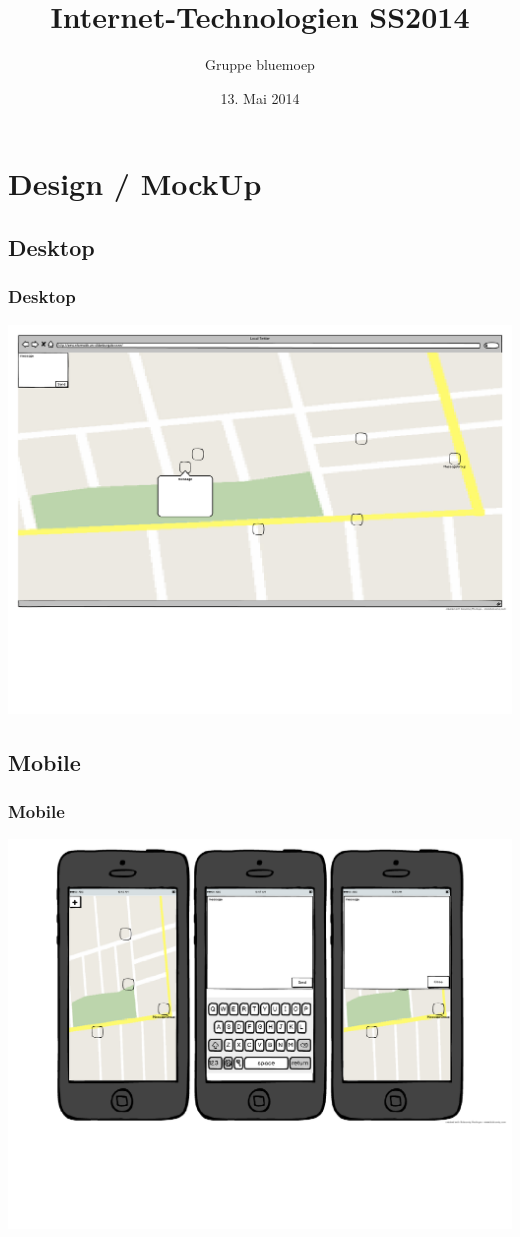 \documentclass[aspectratio=43]{beamer}
\title{Internet-Technologien SS2014}
\author{Gruppe bluemoep}
\date{13. Mai 2014}
\begin{document}
\frame{\maketitle}
 
\section{Design / MockUp}
\subsection{Desktop}
\begin{frame}
	\frametitle{Desktop}
	\includegraphics[width=\textwidth]{ITDesktopMockUp.pdf}
\end{frame}

\subsection{Mobile}
\begin{frame}
	\frametitle{Mobile}
	\includegraphics[width=\textwidth]{ITMobileMockUp.pdf}
\end{frame}

\end{document}

